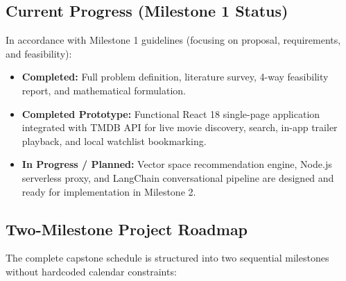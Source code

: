 \documentclass[11pt,a4paper]{article}
\begin{document}
\subsection{Current Progress (Milestone 1 Status)}
In accordance with Milestone 1 guidelines (focusing on proposal, requirements, and feasibility):
\begin{itemize}[leftmargin=*]
    \item \textbf{Completed:} Full problem definition, literature survey, 4-way feasibility report, and mathematical formulation.
    \item \textbf{Completed Prototype:} Functional React 18 single-page application integrated with TMDB API for live movie discovery, search, in-app trailer playback, and local watchlist bookmarking.
    \item \textbf{In Progress / Planned:} Vector space recommendation engine, Node.js serverless proxy, and LangChain conversational pipeline are designed and ready for implementation in Milestone 2.
\end{itemize}

\subsection{Two-Milestone Project Roadmap}
The complete capstone schedule is structured into two sequential milestones without hardcoded calendar constraints:
\end{document}
